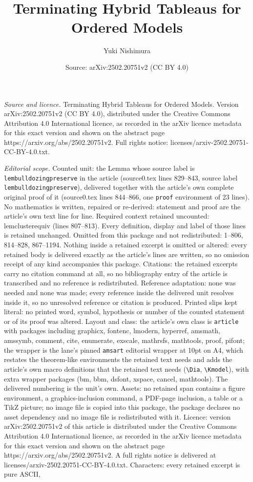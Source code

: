 \documentclass[10pt,a4paper]{amsart}
\title[Terminating Hybrid Tableaus for Ordered Models]{Terminating Hybrid Tableaus for Ordered Models}
\author{Yuki Nishimura}
\date{Source: arXiv:2502.20751v2 (CC BY 4.0)}
\begin{document}
\maketitle

\noindent\emph{Source and licence.} Terminating Hybrid Tableaus for Ordered Models. Version arXiv:2502.20751v2 (CC BY 4.0), distributed under the Creative Commons Attribution 4.0 International licence, as recorded in the arXiv licence metadata for this exact version and shown on the abstract page https://arxiv.org/abs/2502.20751v2. Full rights notice: licenses/arxiv-2502.20751-CC-BY-4.0.txt.\par\smallskip

\noindent\textit{Editorial scope.} Counted unit: the Lemma whose source label is \texttt{lembulldozingpreserve} in the article (source0.tex lines 829--843, source label \texttt{lembulldozingpreserve}), delivered together with the article's own complete original proof of it (source0.tex lines 844--866, one \texttt{proof} environment of 23 lines). No mathematics is written, repaired or re-derived: statement and proof are the article's own text line for line. Required context retained uncounted: lemclusterequiv (lines 807--813). Every definition, display and label of those lines is retained unchanged. Omitted from this package and not redistributed: 1--806, 814--828, 867--1194. Nothing inside a retained excerpt is omitted or altered: every retained body is delivered exactly as the article's lines are written, so no omission receipt of any kind accompanies this package. Citations: the retained excerpts carry no citation command at all, so no bibliography entry of the article is transcribed and no reference is redistributed. Reference adaptation: none was needed and none was made; every reference inside the delivered unit resolves inside it, so no unresolved reference or citation is produced. Printed slips kept literal: no printed word, symbol, hypothesis or number of the counted statement or of its proof was altered. Layout and class: the article's own class is \texttt{article} with packages including graphicx, fontenc, lmodern, hyperref, amsmath, amssymb, comment, cite, enumerate, exscale, mathrsfs, mathtools, proof, pifont; the wrapper is the lane's pinned \texttt{amsart} editorial wrapper at 10pt on A4, which restates the theorem-like environments the retained text needs and adds the article's own macro definitions that the retained text needs (\texttt{\textbackslash Dia}, \texttt{\textbackslash Kmodel}), with extra wrapper packages (bm, bbm, dsfont, xspace, cancel, mathtools). The delivered numbering is the unit's own. Assets: no retained span contains a figure environment, a graphics-inclusion command, a PDF-page inclusion, a table or a TikZ picture; no image file is copied into this package, the package declares no asset dependency and no image file is redistributed with it. Licence: version arXiv:2502.20751v2 of this article is distributed under the Creative Commons Attribution 4.0 International licence, as recorded in the arXiv licence metadata for this exact version and shown on the abstract page https://arxiv.org/abs/2502.20751v2. A full rights notice is delivered at licenses/arxiv-2502.20751-CC-BY-4.0.txt. Characters: every retained excerpt is pure ASCII, 
\end{document}
